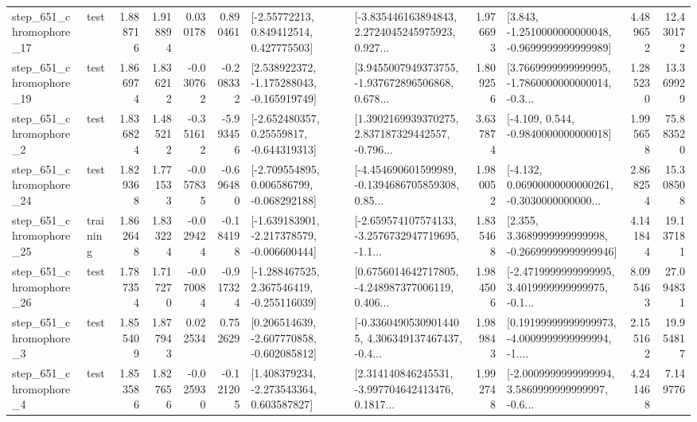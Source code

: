 \begin{tabular}{llrrrrllrlrr}
  step\_651\_chromophore\_17 &      test &      1.888716 &    1.918894 &      0.030178 &  0.890461 &     [-2.55772213, 0.849412514, 0.427775503] &  [-3.835446163894843, 2.2724045245975923, 0.927... &       1.976693 &  [3.843, -1.2510000000000048, -0.9699999999999989] &            4.489652 &         12.430172 \\
  step\_651\_chromophore\_19 &      test &      1.866974 &    1.836212 &     -0.030762 & -0.208332 &   [2.538922372, -1.175288043, -0.165919749] &  [3.9455007949373755, -1.937672896506868, 0.678... &       1.809256 &  [3.7669999999999995, -1.7860000000000014, -0.3... &            1.285230 &         13.369929 \\
   step\_651\_chromophore\_2 &      test &      1.836824 &    1.485212 &     -0.351612 & -5.993456 &    [-2.652480357, 0.25559817, -0.644319313] &  [1.3902169939370275, 2.837187329442557, -0.796... &       3.637874 &               [-4.109, 0.544, -0.9840000000000018] &            1.995658 &         75.883520 \\
  step\_651\_chromophore\_24 &      test &      1.829368 &    1.771533 &     -0.057835 & -0.696480 &   [-2.709554895, 0.006586799, -0.068292188] &  [-4.454690601599989, -0.1394686705859308, 0.85... &       1.980052 &  [-4.132, 0.06900000000000261, -0.3030000000000... &            2.868254 &         15.308508 \\
  step\_651\_chromophore\_25 &  training &      1.862648 &    1.833224 &     -0.029424 & -0.184198 &  [-1.639183901, -2.217378579, -0.006600444] &  [-2.659574107574133, -3.2576732947719695, -1.1... &       1.835468 &  [2.355, 3.3689999999999998, -0.26699999999999946] &            4.141844 &         19.137181 \\
  step\_651\_chromophore\_26 &      test &      1.787354 &    1.717270 &     -0.070084 & -0.917324 &   [-1.288467525, 2.367546419, -0.255116039] &  [0.6756014642717805, -4.248987377006119, 0.406... &       1.984506 &  [-2.4719999999999995, 3.4019999999999975, -0.1... &            8.095463 &         27.094831 \\
   step\_651\_chromophore\_3 &      test &      1.855409 &    1.877943 &      0.022534 &  0.752629 &   [0.206514639, -2.607770858, -0.602085812] &  [-0.33604905309014405, 4.306349137467437, -0.4... &       1.989843 &  [0.19199999999999973, -4.0009999999999994, -1.... &            2.155162 &         19.954817 \\
   step\_651\_chromophore\_4 &      test &      1.853586 &    1.827656 &     -0.025930 & -0.121205 &    [1.408379234, -2.273543364, 0.603587827] &  [2.314140846245531, -3.997704642413476, 0.1817... &       1.992748 &  [-2.0009999999999994, 3.5869999999999997, -0.6... &            4.241468 &          7.149776 \\

\end{tabular}
